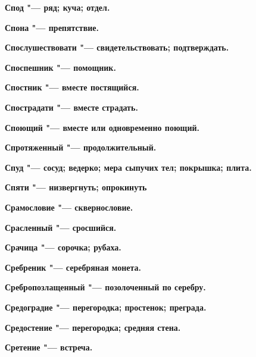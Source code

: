 \bfseries Спод \normalfont{} "--- ряд; куча; отдел. 




\bfseries Спона \normalfont{} "--- препятствие. 




\bfseries Спослушествовати \normalfont{} "--- свидетельствовать; подтверждать. 




\bfseries Споспешник \normalfont{} "--- помощник. 




\bfseries Спостник \normalfont{} "--- вместе постящийся. 




\bfseries Спострадати \normalfont{} "--- вместе страдать. 




\bfseries Споющий \normalfont{} "--- вместе или одновременно поющий. 




\bfseries Спротяженный \normalfont{} "--- продолжительный. 




\bfseries Спуд \normalfont{} "--- сосуд; ведерко; мера сыпучих тел; покрышка; плита. 




\bfseries Спяти \normalfont{} "--- низвергнуть; опрокинуть 




\bfseries Срамословие \normalfont{} "--- сквернословие. 




\bfseries Срасленный \normalfont{} "--- сросшийся. 




\bfseries Срачица \normalfont{} "--- сорочка; рубаха. 




\bfseries Сребреник \normalfont{} "--- серебряная монета. 




\bfseries Сребропозлащенный \normalfont{} "--- позолоченный по серебру. 




\bfseries Средоградие \normalfont{} "--- перегородка; простенок; преграда. 




\bfseries Средостение \normalfont{} "--- перегородка; средняя стена. 




\bfseries Сретение \normalfont{} "--- встреча. 





